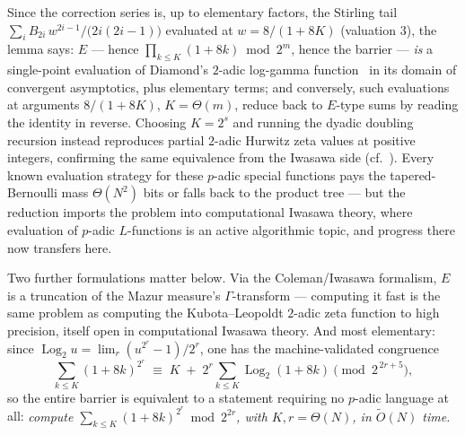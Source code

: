 \documentclass[11pt]{article}
\theoremstyle{remark}
\theoremstyle{definition}
\newcommand{\Ot}{\widetilde{O}}
\begin{document}
Since the correction series is, up to elementary factors, the Stirling
tail $\sum_i B_{2i}\,w^{2i-1}/\bigl(2i(2i-1)\bigr)$ evaluated at
$w=8/(1+8K)$ (valuation $3$), the lemma says: $E$ --- hence
$\prod_{k\le K}(1+8k)\bmod 2^{m}$, hence the barrier --- \emph{is} a
single-point evaluation of Diamond's $2$-adic log-gamma
function~\cite{Diamond77} in its domain of convergent asymptotics, plus
elementary terms; and conversely, such evaluations at arguments
$8/(1+8K)$, $K=\Theta(m)$, reduce back to $E$-type sums by reading the
identity in reverse. Choosing $K=2^{s}$ and running the dyadic doubling
recursion instead reproduces partial $2$-adic Hurwitz zeta values at
positive integers, confirming the same equivalence from the Iwasawa side
(cf.~\cite{Washington}). Every known evaluation strategy for these
$p$-adic special functions pays the tapered-Bernoulli mass
$\Theta(N^{2})$ bits or falls back to the product tree --- but the
reduction imports the problem into computational Iwasawa theory, where
evaluation of $p$-adic $L$-functions is an active algorithmic topic, and
progress there now transfers here.

Two further formulations matter below. Via the Coleman/Iwasawa
formalism, $E$ is a truncation of the Mazur measure's $\Gamma$-transform
--- computing it fast is the same problem as computing the
Kubota--Leopoldt $2$-adic zeta function to high precision, itself open in
computational Iwasawa theory. And most elementary: since
$\operatorname{Log}_2 u=\lim_r (u^{2^{r}}-1)/2^{r}$, one has the
machine-validated congruence
\[
\sum_{k\le K}(1+8k)^{2^{r}}\;\equiv\; K \;+\;
2^{r}\!\sum_{k\le K}\operatorname{Log}_2(1+8k)
\pmod{2^{\,2r+5}},
\]
so the entire barrier is equivalent to a statement requiring no $p$-adic
language at all: \emph{compute
$\sum_{k\le K}(1+8k)^{2^{r}}\bmod 2^{2r}$, with $K,r=\Theta(N)$, in
$\Ot(N)$ time.}
\end{document}
